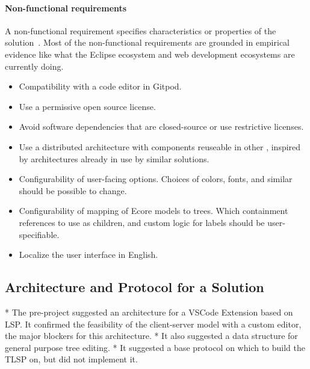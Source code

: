 \paragraph{Non-functional requirements}
A non-functional requirement specifies characteristics or properties of the solution~\cite[p.~7]{wiegersSoftwareRequirements2013}.
Most of the non-functional requirements are grounded in empirical evidence like what the Eclipse ecosystem and web development ecosystems are currently doing.

\begin{itemize}
  \item Compatibility with a code editor in \gls{Gitpod}.
  \item Use a permissive \gls{open source} license.
  \item Avoid software dependencies that are closed-source or use restrictive licenses.
  \item Use a distributed architecture with components reuseable in other , inspired by architectures already in use by similar solutions.
  \item Configurability of user-facing options. Choices of colors, fonts, and similar should be possible to change.
  \item Configurability of mapping of \gls{Ecore} models to trees. Which containment references to use as children, and custom logic for labels should be user-specifiable.
  \item Localize the user interface in English.
\end{itemize}


\subsection{Architecture and Protocol for a Solution}
* The pre-project suggested an architecture for a VSCode Extension based on LSP. It confirmed the feasibility of the client-server model with a custom editor, the major blockers for this architecture.
  * It also suggested a data structure for general purpose tree editing.
  * It suggested a base protocol on which to build the TLSP on, but did not implement it.

